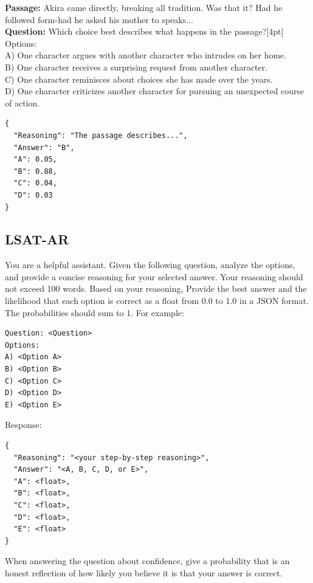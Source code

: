 \documentclass{article}
\begin{document}
\begin{appendices}
\begin{userbox}
\textbf{Passage:} Akira came directly, breaking all tradition. Was that it? Had he followed form-had he asked his mother to speaks...\\[4pt]
\textbf{Question:}  Which choice best describes what happens in the passage?[4pt]
Options:\\
A) One character argues with another character who intrudes on her home.\\
B) One character receives a surprising request from another character.\\
C) One character reminisces about choices she has made over the years.\\
D) One character criticizes another character for pursuing an unexpected course of action.\\
\end{userbox}

\begin{llmbox}
\begin{lstlisting}[style=json]
{
  "Reasoning": "The passage describes...",
  "Answer": "B",
  "A": 0.05,
  "B": 0.88,
  "C": 0.04,
  "D": 0.03
}
\end{lstlisting}
\end{llmbox}

\subsection{LSAT-AR}\label{sec:prompt-lsatar}

\begin{systembox}You are a helpful assistant. Given the following question, analyze the options, and provide a concise reasoning for your selected answer. Your reasoning should not exceed 100 words. 
Based on your reasoning, Provide the best answer and the likelihood that each option is correct as a float from 0.0 to 1.0 in a JSON format. The probabilities should sum to 1. For example:
\begin{verbatim}
Question: <Question>
Options:
A) <Option A>
B) <Option B>
C) <Option C>
D) <Option D>
E) <Option E>
\end{verbatim}


Response:

\begin{lstlisting}[style=json]
{
  "Reasoning": "<your step-by-step reasoning>",
  "Answer": "<A, B, C, D, or E>",
  "A": <float>, 
  "B": <float>, 
  "C": <float>,
  "D": <float>, 
  "E": <float>
}
\end{lstlisting}
When answering the question about confidence, give a probability that is an honest reflection of how likely you believe it is that your answer is correct.
\end{systembox}


\end{appendices}
\end{document}
